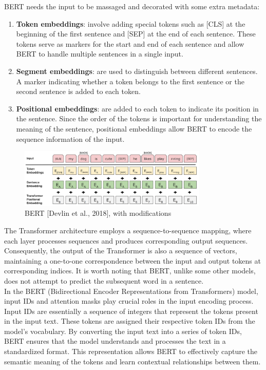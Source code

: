 \documentclass[conference]{IEEEtran}
\begin{document}
BERT needs the input to be massaged and decorated with some extra metadata:
    
\begin{enumerate}

\item \textbf{Token embeddings}: involve adding special tokens such as [CLS] at the beginning of the first sentence and [SEP] at the end of each sentence. These tokens serve as markers for the start and end of each sentence and allow BERT to handle multiple sentences in a single input.
    
\item \textbf{Segment embeddings}: are used to distinguish between different sentences. A marker indicating whether a token belongs to the first sentence or the second sentence is added to each token.
    
\item \textbf{Positional embeddings}: are added to each token to indicate its position in the sentence. Since the order of the tokens is important for understanding the meaning of the sentence, positional embeddings allow BERT to encode the sequence information of the input.
\end{enumerate}

 \begin{figure}[h]
\centering
 \includegraphics[width=9cm]{BERT}
 \caption{ BERT [Devlin et al., 2018], with modifications}
 \end{figure}
 
	The Transformer architecture employs a sequence-to-sequence mapping, where each layer processes sequences and produces corresponding output sequences. Consequently, the output of the Transformer is also a sequence of vectors, maintaining a one-to-one correspondence between the input and output tokens at corresponding indices. It is worth noting that BERT, unlike some other models, does not attempt to predict the subsequent word in a sentence.\\

	In the BERT (Bidirectional Encoder Representations from Transformers) model, input IDs and attention masks play crucial roles in the input encoding process. Input IDs are essentially a sequence of integers that represent the tokens present in the input text. These tokens are assigned their respective token IDs from the model's vocabulary. By converting the input text into a series of token IDs, BERT ensures that the model understands and processes the text in a standardized format. This representation allows BERT to effectively capture the semantic meaning of the tokens and learn contextual relationships between them.\\
\end{document}
